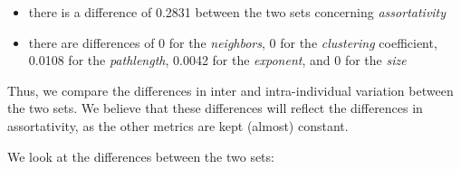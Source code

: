 \documentclass[
]{article}
\providecommand{\tightlist}{%
  \setlength{\itemsep}{0pt}\setlength{\parskip}{0pt}}
\begin{document}
\begin{itemize}
\tightlist
\item
  there is a difference of 0.2831 between the two sets concerning
  \emph{assortativity}
\item
  there are differences of 0 for the \emph{neighbors}, 0 for the
  \emph{clustering} coefficient, 0.0108 for the \emph{pathlength},
  0.0042 for the \emph{exponent}, and 0 for the \emph{size}
\end{itemize}

Thus, we compare the differences in inter and intra-individual variation
between the two sets. We believe that these differences will reflect the
differences in assortativity, as the other metrics are kept (almost)
constant.

We look at the differences between the two sets:
\end{document}
